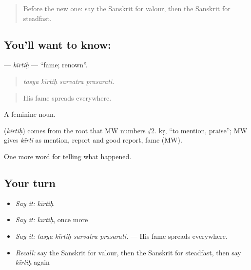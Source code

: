 \label{lesson:SA-C314-kirtih}



\begin{quote}
Before the new one: say the Sanskrit for valour, then the Sanskrit for steadfast.
\end{quote}

\subsection*{You'll want to know: }
\textbf{} — \emph{kīrtiḥ} — \textquotedblleft{}fame; renown\textquotedblright{}.

\begin{quote}
   
\end{quote}

\begin{quote}
\emph{tasya kīrtiḥ sarvatra prasarati.}
\end{quote}

\begin{quote}
His fame spreads everywhere.
\end{quote}

A feminine noun.

\begin{cousinweb}
\textbf{} (\emph{kīrtiḥ}) comes from the root that MW numbers √2. kṛ, \textquotedblleft{}to mention, praise\textquotedblright{}; MW gives \emph{kīrti} as mention, report and good report, fame (MW).
\end{cousinweb}

\begin{grammarlens}[title={What you've built}]
One more word for telling what happened.
\end{grammarlens}

\subsection*{Your turn}
\begin{itemize}
\raggedright
  \item \emph{Say it:} \emph{kīrtiḥ}
  \item \emph{Say it:} \emph{kīrtiḥ}, once more
  \item \emph{Say it:} \emph{tasya kīrtiḥ sarvatra prasarati.} — His fame spreads everywhere.
  \item \emph{Recall:} say the Sanskrit for valour, then the Sanskrit for steadfast, then say \emph{kīrtiḥ} again
\end{itemize}


